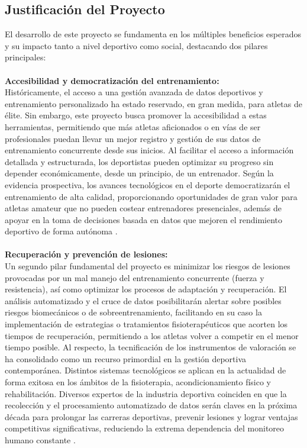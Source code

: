 \documentclass[12pt]{article}
\begin{document}
\subsection{Justificación del Proyecto}

El desarrollo de este proyecto se fundamenta en los múltiples beneficios esperados y su impacto tanto a nivel deportivo como social, destacando dos pilares principales:
\\\\
\textbf{Accesibilidad y democratización del entrenamiento:}\\
Históricamente, el acceso a una gestión avanzada de datos deportivos y entrenamiento personalizado ha estado reservado, en gran medida, para atletas de élite. Sin embargo, este proyecto busca promover la accesibilidad a estas herramientas, permitiendo que más atletas aficionados o en vías de ser profesionales puedan llevar un mejor registro y gestión de sus datos de entrenamiento concurrente desde sus inicios. Al facilitar el acceso a información detallada y estructurada, los deportistas pueden optimizar su progreso sin depender económicamente, desde un principio, de un entrenador. Según la evidencia prospectiva, los avances tecnológicos en el deporte democratizarán el entrenamiento de alta calidad, proporcionando oportunidades de gran valor para atletas amateur que no pueden costear entrenadores presenciales, además de apoyar en la toma de decisiones basada en datos que mejoren el rendimiento deportivo de forma autónoma \citep{frevel2022impact}.
\\\\
\textbf{Recuperación y prevención de lesiones:}\\
Un segundo pilar fundamental del proyecto es minimizar los riesgos de lesiones provocadas por un mal manejo del entrenamiento concurrente (fuerza y resistencia), así como optimizar los procesos de adaptación y recuperación. El análisis automatizado y el cruce de datos posibilitarán alertar sobre posibles riesgos biomecánicos o de sobreentrenamiento, facilitando en su caso la implementación de estrategias o tratamientos fisioterapéuticos que acorten los tiempos de recuperación, permitiendo a los atletas volver a competir en el menor tiempo posible. Al respecto, la tecnificación de los instrumentos de valoración se ha consolidado como un recurso primordial en la gestión deportiva contemporánea. Distintos sistemas tecnológicos se aplican en la actualidad de forma exitosa en los ámbitos de la fisioterapia, acondicionamiento físico y rehabilitación. Diversos expertos de la industria deportiva coinciden en que la recolección y el procesamiento automatizado de datos serán claves en la próxima década para prolongar las carreras deportivas, prevenir lesiones y lograr ventajas competitivas significativas, reduciendo la extrema dependencia del monitoreo humano constante \citep{frevel2022impact}.
\end{document}
